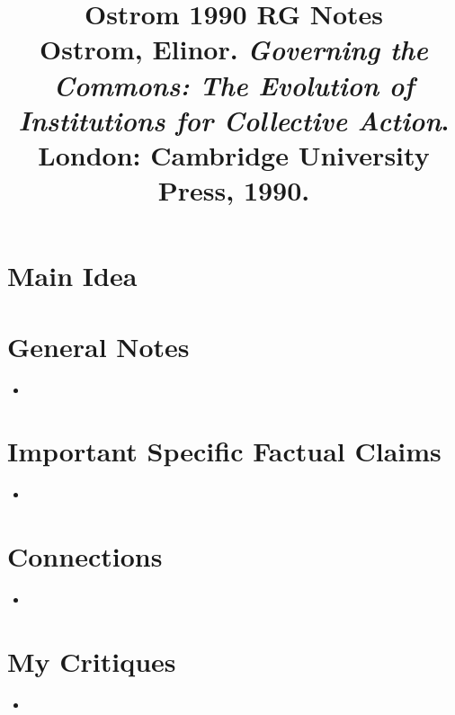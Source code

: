 \documentclass[12pt]{article}
\title{\textbf{Ostrom 1990 RG Notes}\\
\large Ostrom, Elinor. \textit{Governing the Commons: The Evolution of Institutions for Collective Action}.\\
London: Cambridge University Press, 1990.}
\author{}
\date{}
\begin{document}
\maketitle

\section{Main Idea}



\section{General Notes}

\begin{itemize}[leftmargin=*, itemsep=4pt]
    \item
\end{itemize}


\section{Important Specific Factual Claims}

\begin{itemize}[leftmargin=*, itemsep=4pt]
    \item
\end{itemize}


\section{Connections}

\begin{itemize}
    \item
\end{itemize}


\section{My Critiques}

\begin{itemize}
    \item
\end{itemize}
\end{document}
